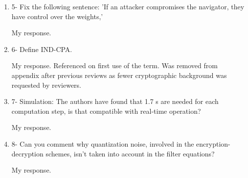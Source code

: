 \documentclass[a4paper]{scrartcl}
\newenvironment{rebuttal}{\begin{enumerate}[label={\color{grey}\thesection.\arabic{enumi}},leftmargin=0pt,ref=\thesection.\arabic{enumi}]}{\end{enumerate}}
\newcommand{\reviewtext}[1]{{\color{nblue} #1}}
\begin{document}
\begin{rebuttal}
My response.
Continuation from above. Since nothing is to be learnt, then any information from the navigator involved in the localisation must remain private. In practice, as is later evident from the concrete use of the scheme, the weights correspond to the navigator estimate which we want to hide from sensors

\item \reviewtext{5- Fix the following sentence: 'If an attacker compromises the navigator, they have control over the weights,'}

My response.

\item \reviewtext{6- Define IND-CPA.}

My response.
Referenced on first use of the term. Was removed from appendix after previous reviews as fewer cryptographic background was requested by reviewers.

\item \reviewtext{7- Simulation: The authors have found that 1.7 s are needed for each
computation step, is that compatible with real-time operation?}

My response.

\item \reviewtext{8- Can you comment why quantization noise, involved in the encryption-decryption schemes, isn't taken into account in the filter equations?}

My response.


\end{rebuttal}

\end{document}
